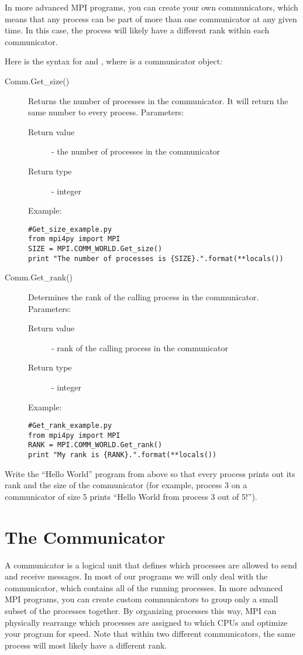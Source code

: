 In more advanced MPI programs, you can create your own communicators, which means that 
any process can be part of more than one communicator at any given time. 
In this case, the process will likely have a different rank within each communicator.


Here is the syntax for  and , where  is a communicator object:
\begin{description}
\item[Comm.Get\_size()]
Returns the number of processes in the communicator. It will return the same number to every process.
Parameters:
\begin{description}
    \item[Return value] - the number of processes in the communicator
    \item[Return type] - integer
\end{description}
Example:
\begin{lstlisting}
#Get_size_example.py
from mpi4py import MPI
SIZE = MPI.COMM_WORLD.Get_size()
print "The number of processes is {SIZE}.".format(**locals())
\end{lstlisting}
\item[Comm.Get\_rank()]
Determines the rank of the calling process in the communicator.
Parameters:
\begin{description}
    \item[Return value] - rank of the calling process in the communicator
    \item[Return type] - integer
\end{description}
Example:
\begin{lstlisting}
#Get_rank_example.py
from mpi4py import MPI
RANK = MPI.COMM_WORLD.Get_rank()
print "My rank is {RANK}.".format(**locals())
\end{lstlisting}
\end{description}

\begin{problem}
Write the ``Hello World'' program from above so that every process prints out its 
rank and the size of the communicator 
(for example, process 3 on a communicator of size 5 prints ``Hello World from process 3 out of 5!'').
\end{problem}

\section*{The Communicator}
A communicator is a logical unit that defines which processes are allowed to 
send and receive messages. In most of our programs we will only deal with the  
communicator, which contains all of the running processes. 
In more advanced MPI programs, you can create custom communicators to group only a small 
subset of the processes together. By organizing processes this way, MPI can 
physically rearrange which processes are assigned to which CPUs and optimize your 
program for speed. Note that within two different communicators, the same process 
will most likely have a different rank.

